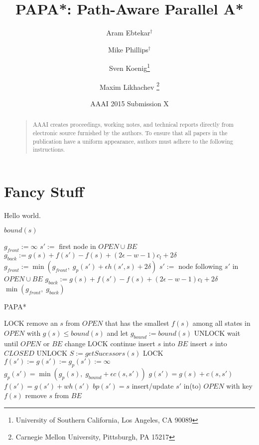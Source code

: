 \documentclass[letterpaper]{article}
\begin{document}
%
\title{PAPA*: Path-Aware Parallel A*}
\author{Aram Ebtekar$^\dagger$ \and Mike Phillips$^\dagger$ \and Sven Koenig\thanks{University of Southern California, Los Angeles, CA 90089} \and Maxim Likhachev%
\thanks{Carnegie Mellon University, Pittsburgh, PA 15217}%
%
}
\author{AAAI 2015 Submission X}%
\maketitle
\begin{abstract}
\begin{quote}
AAAI creates proceedings, working notes, and technical reports directly from electronic source furnished by the authors. To ensure that all papers in the publication have a uniform appearance, authors must adhere to the following instructions. 
\end{quote}
\end{abstract}

\section{Fancy Stuff}

Hello world.

\begin{algorithm}
\caption{$bound(s)$}
\label{alg:bound}
\begin{algorithmic}
\STATE $g_{front} := \infty$
\STATE $s' :=$ first node in $OPEN \cup BE$
\STATE $g_{back} := g(s) + f(s') - f(s) + (2\epsilon-w-1) c_l + 2\delta$
\STATE $g_{front} := \min(g_{front},\;g_p(s') + \epsilon h(s',s) + 2\delta)$
\STATE $s' :=$ node following $s'$ in $OPEN \cup BE$
\STATE $g_{back} := g(s) + f(s') - f(s) + (2\epsilon-w-1) c_l + 2\delta$
\ENDWHILE
\RETURN $\min(g_{front},\;g_{back})$
\end{algorithmic}
\end{algorithm}

\begin{algorithm}
\caption{PAPA*}
\label{alg:PAPA*}
\begin{algorithmic}
\STATE LOCK
\STATE remove an $s$ from $OPEN$ that has the smallest $f(s)$ among all states in $OPEN$ with $g(s) \le bound(s)$ and let $g_{bound} := bound(s)$
\STATE UNLOCK
\STATE wait until $OPEN$ or $BE$ change
\STATE LOCK
\STATE continue
\ENDIF
\STATE insert $s$ into $BE$
\STATE insert $s$ into $CLOSED$
\STATE UNLOCK
\STATE $S := getSucessors(s)$
\STATE LOCK
\STATE $f(s') := g(s') := g_p(s') := \infty$
\ENDIF
{}
\STATE $g_p(s') = \min(g_p(s),\; g_{bound} + \epsilon c(s,s'))$
\STATE $g(s') = g(s) + c(s,s')$
\STATE $f(s') = g(s') + wh(s')$
\STATE $bp(s') = s$
\STATE insert/update $s'$ in(to) $OPEN$ with key $f(s)$
\ENDIF
\ENDIF
\ENDFOR
\STATE remove $s$ from $BE$
\ENDWHILE
\end{algorithmic}
\end{algorithm}
\end{document}
